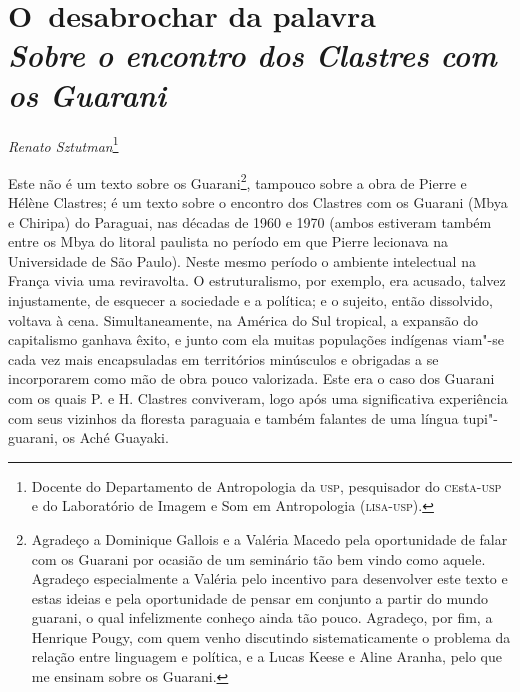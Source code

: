 \thispagestyle{empty}

\chapter*{O~desabrochar da palavra\\
\large{\emph{Sobre o encontro dos Clastres com os Guarani}}}


\begin{flushright}
\emph{Renato Sztutman}\footnote{Docente do Departamento de Antropologia da \textsc{usp},
pesquisador do \textsc{ce}st\textsc{a}-\textsc{usp} e do Laboratório de Imagem e Som em
Antropologia (\textsc{lisa}-\textsc{usp}).}
\end{flushright}
\medskip

\noindent Este não é um texto sobre os Guarani\footnote{Agradeço a Dominique
Gallois e a Valéria Macedo pela oportunidade de falar com os Guarani
por ocasião de um seminário tão bem vindo como aquele. Agradeço
especialmente a Valéria pelo incentivo para desenvolver este texto e
estas ideias e pela oportunidade de pensar em conjunto a partir do
mundo guarani, o qual infelizmente conheço ainda tão pouco. Agradeço,
por fim, a Henrique Pougy, com quem venho discutindo sistematicamente o
problema da relação entre linguagem e política, e a Lucas Keese e Aline
Aranha, pelo que me ensinam sobre os Guarani.}, tampouco sobre a obra
de Pierre e Hélène Clastres; é um texto sobre o encontro dos Clastres
com os Guarani (Mbya e Chiripa) do Paraguai, nas décadas de 1960 e
1970 (ambos estiveram também entre os Mbya do litoral paulista no
período em que Pierre lecionava na Universidade de São Paulo). Neste
mesmo período o ambiente intelectual na França vivia uma reviravolta. O
estruturalismo, por exemplo, era acusado, talvez injustamente, de
esquecer a sociedade e a política; e o sujeito, então dissolvido,
voltava à cena. Simultaneamente, na América do Sul tropical, a expansão
do capitalismo ganhava êxito, e junto com ela muitas populações
indígenas viam"-se cada vez mais encapsuladas em territórios minúsculos
e obrigadas a se incorporarem como mão de obra pouco valorizada. Este
era o caso dos Guarani com os quais P. e H. Clastres conviveram, logo
após uma significativa experiência com seus vizinhos da floresta
paraguaia e também falantes de uma língua tupi"-guarani, os Aché
Guayaki.


